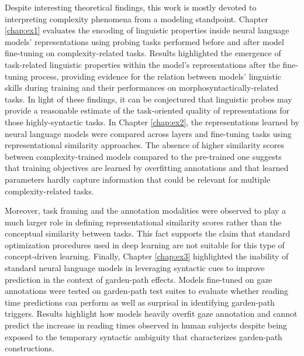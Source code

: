 \documentclass[a4paper, nobind]{templates/ociamthesis}
\begin{document}
Despite interesting theoretical findings, this work is mostly devoted to interpreting complexity phenomena from a modeling standpoint. Chapter \ref{chap:ex1} evaluates the encoding of linguistic properties inside neural language models' representations using probing tasks performed before and after model fine-tuning on complexity-related tasks. Results highlighted the emergence of task-related linguistic properties within the model's representations after the fine-tuning process, providing evidence for the relation between models' linguistic skills during training and their performances on morphosyntactically-related tasks. In light of these findings, it can be conjectured that linguistic probes may provide a reasonable estimate of the task-oriented quality of representations for those highly-syntactic tasks. In Chapter \ref{chap:ex2}, the representations learned by neural language models were compared across layers and fine-tuning tasks using representational similarity approaches. The absence of higher similarity scores between complexity-trained models compared to the pre-trained one suggests that training objectives are learned by overfitting annotations and that learned parameters hardly capture information that could be relevant for multiple complexity-related tasks.

Moreover, task framing and the annotation modalities were observed to play a much larger role in defining representational similarity scores rather than the conceptual similarity between tasks. This fact supports the claim that standard optimization procedures used in deep learning are not suitable for this type of concept-driven learning. Finally, Chapter \ref{chap:ex3} highlighted the inability of standard neural language models in leveraging syntactic cues to improve prediction in the context of garden-path effects. Models fine-tuned on gaze annotations were tested on garden-path test suites to evaluate whether reading time predictions can perform as well as surprisal in identifying garden-path triggers. Results highlight how models heavily overfit gaze annotation and cannot predict the increase in reading times observed in human subjects despite being exposed to the temporary syntactic ambiguity that characterizes garden-path constructions.
\end{document}
